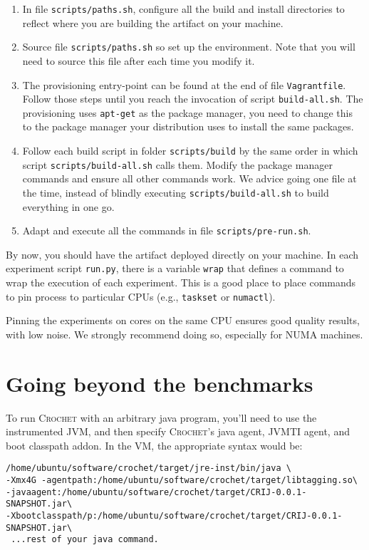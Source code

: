 \documentclass[12pt]{article}
\newcommand{\host}[1]{\colorbox{blue!20}{\texttt{\color{black}#1}}}
\newcommand{\sysname}{\textsc{Crochet}\xspace}
\begin{document}
\begin{enumerate}

    \item In file \host{scripts/paths.sh}, configure all the build and install
        directories to reflect where you are building the artifact on your
        machine.

    \item Source file \host{scripts/paths.sh} so set up the environment.  Note
        that you will need to source this file after each time you modify it.

    \item The provisioning entry-point can be found at the end of file
        \host{Vagrantfile}.  Follow those steps until you reach the invocation
        of script \texttt{build-all.sh}. The provisioning uses \texttt{apt-get}
        as the package manager, you need to change this to the package manager
        your distribution uses to install the same packages.

    \item Follow each build script in folder \host{scripts/build} by the same
        order in which script \host{scripts/build-all.sh} calls them.  Modify
        the package manager commands and ensure all other commands work.  We
        advice going one file at the time, instead of blindly executing
        \host{scripts/build-all.sh} to build everything in one go.

    \item Adapt and execute all the commands in file
        \host{scripts/pre-run.sh}.

\end{enumerate}

By now, you should have the artifact deployed directly on your machine.  In each
experiment script \texttt{run.py}, there is a variable \texttt{wrap} that
defines a command to wrap the execution of each experiment.  This is a good
place to place commands to pin process to particular CPUs (e.g.,
\texttt{taskset} or \texttt{numactl}).

Pinning the experiments on cores on the same CPU ensures good quality results,
with low noise.  We strongly recommend doing so, especially for NUMA machines.

\section{Going beyond the benchmarks}
To run \sysname with an arbitrary java program, you'll need to use the instrumented JVM, and then specify \sysname's java agent, JVMTI agent, and boot classpath addon. In the VM, the appropriate syntax would be:
\begin{verbatim}
/home/ubuntu/software/crochet/target/jre-inst/bin/java \
-Xmx4G -agentpath:/home/ubuntu/software/crochet/target/libtagging.so\
-javaagent:/home/ubuntu/software/crochet/target/CRIJ-0.0.1-SNAPSHOT.jar\
-Xbootclasspath/p:/home/ubuntu/software/crochet/target/CRIJ-0.0.1-SNAPSHOT.jar\
 ...rest of your java command.	
\end{verbatim}
 
\end{document}
